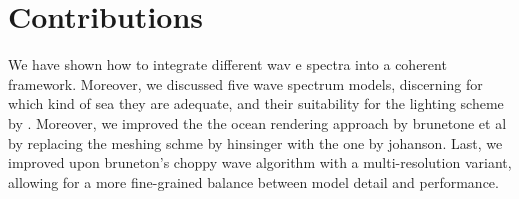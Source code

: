 
%
%
%

%





%
\section{Contributions}
\textcolor{changed}{
We have shown how to integrate different wav e spectra into a coherent
framework. Moreover, we discussed five wave spectrum models, discerning
for which kind of sea they are adequate, and their suitability for
the lighting scheme by \citet{article:oceanlighting,misc:oceanlightingfft,article:whitecaps}.
Moreover, we improved the
the ocean rendering approach by brunetone et al by replacing the
meshing schme by hinsinger with the one by johanson. Last, we improved
upon bruneton's choppy wave algorithm with a multi-resolution variant,
allowing for a more fine-grained balance between model detail and
performance.
}
%
